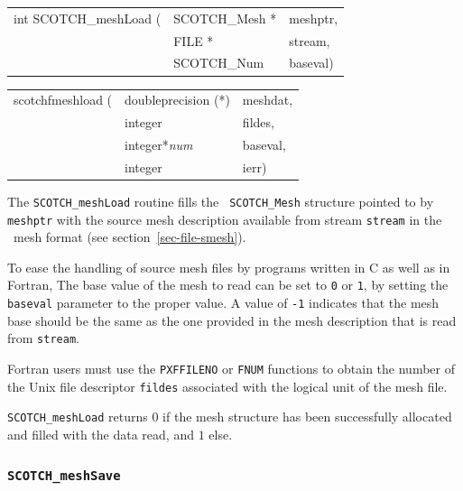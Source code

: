 \begin{itemize}
\progsyn

{\tt\begin{tabular}{l@{}ll}
int SCOTCH\_meshLoad ( & SCOTCH\_Mesh * & meshptr, \\
                       & FILE *         & stream, \\
                       & SCOTCH\_Num    & baseval)
\end{tabular}}

{\tt\begin{tabular}{l@{}ll}
scotchfmeshload ( & doubleprecision (*) & meshdat, \\
                  & integer             & fildes,  \\
                  & integer*{\it num}   & baseval, \\
                  & integer             & ierr)
\end{tabular}}

\progdes

The {\tt SCOTCH\_meshLoad} routine fills the {\tt
SCOTCH\_\lbt Mesh} structure pointed to by {\tt meshptr} with the
source mesh description available from stream {\tt stream} in the
\scotch\ mesh format (see section~\ref{sec-file-smesh}).

To ease the handling of source mesh files by programs written in C as
well as in Fortran, The base value of the mesh to read can be set
to {\tt 0} or {\tt 1}, by setting the {\tt baseval} parameter to the
proper value. A value of {\tt -1} indicates that the mesh base should
be the same as the one provided in the mesh description that is read
from {\tt stream}.

Fortran users must use the {\tt PXFFILENO} or {\tt FNUM} functions to
obtain the number of the Unix file descriptor {\tt fildes} associated
with the logical unit of the mesh file.

\progret

{\tt SCOTCH\_meshLoad} returns $0$ if the mesh structure has been
successfully allocated and filled with the data read, and $1$ else.
\end{itemize}

\subsubsection{{\tt SCOTCH\_meshSave}}

